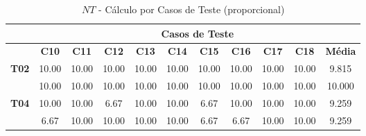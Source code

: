 \begin{table}[htbp]
	\centering
	\caption{$NT$ - Cálculo por Casos de Teste (proporcional)}
	\begin{tabular}{c|cccccccccc|}
		\cline{2-11}
		\rowcolor[HTML]{D0CECE} 
		\cellcolor[HTML]{F2F2F2}\textbf{} & \multicolumn{10}{c|}{\cellcolor[HTML]{D0CECE}\textbf{Casos de Teste}} \\ \hline
		\rowcolor[HTML]{D9D9D9} 
		\multicolumn{1}{|c|}{\cellcolor[HTML]{D0CECE}\textbf{Part.}} & \multicolumn{1}{c|}{\cellcolor[HTML]{D9D9D9}\textbf{C10}} & \multicolumn{1}{c|}{\cellcolor[HTML]{D9D9D9}\textbf{C11}} & \multicolumn{1}{c|}{\cellcolor[HTML]{D9D9D9}\textbf{C12}} & \multicolumn{1}{c|}{\cellcolor[HTML]{D9D9D9}\textbf{C13}} & \multicolumn{1}{c|}{\cellcolor[HTML]{D9D9D9}\textbf{C14}} & \multicolumn{1}{c|}{\cellcolor[HTML]{D9D9D9}\textbf{C15}} & \multicolumn{1}{c|}{\cellcolor[HTML]{D9D9D9}\textbf{C16}} & \multicolumn{1}{c|}{\cellcolor[HTML]{D9D9D9}\textbf{C17}} & \multicolumn{1}{c|}{\cellcolor[HTML]{D9D9D9}\textbf{C18}} & \textbf{Média} \\ \hline
		\multicolumn{1}{|c|}{\textbf{T02}} & \multicolumn{1}{c|}{10.00} & \multicolumn{1}{c|}{10.00} & \multicolumn{1}{c|}{10.00} & \multicolumn{1}{c|}{10.00} & \multicolumn{1}{c|}{10.00} & \multicolumn{1}{c|}{10.00} & \multicolumn{1}{c|}{10.00} & \multicolumn{1}{c|}{10.00} & \multicolumn{1}{c|}{10.00} & 9.815 \\ \hline
		\rowcolor[HTML]{F2F2F2} 
		\multicolumn{1}{|c|}{\cellcolor[HTML]{F2F2F2}\textbf{T03}} & \multicolumn{1}{c|}{\cellcolor[HTML]{F2F2F2}10.00} & \multicolumn{1}{c|}{\cellcolor[HTML]{F2F2F2}10.00} & \multicolumn{1}{c|}{\cellcolor[HTML]{F2F2F2}10.00} & \multicolumn{1}{c|}{\cellcolor[HTML]{F2F2F2}10.00} & \multicolumn{1}{c|}{\cellcolor[HTML]{F2F2F2}10.00} & \multicolumn{1}{c|}{\cellcolor[HTML]{F2F2F2}10.00} & \multicolumn{1}{c|}{\cellcolor[HTML]{F2F2F2}10.00} & \multicolumn{1}{c|}{\cellcolor[HTML]{F2F2F2}10.00} & \multicolumn{1}{c|}{\cellcolor[HTML]{F2F2F2}10.00} & 10.000 \\ \hline
		\multicolumn{1}{|c|}{\textbf{T04}} & \multicolumn{1}{c|}{10.00} & \multicolumn{1}{c|}{10.00} & \multicolumn{1}{c|}{6.67} & \multicolumn{1}{c|}{10.00} & \multicolumn{1}{c|}{10.00} & \multicolumn{1}{c|}{6.67} & \multicolumn{1}{c|}{10.00} & \multicolumn{1}{c|}{10.00} & \multicolumn{1}{c|}{10.00} & 9.259 \\ \hline
		\rowcolor[HTML]{F2F2F2} 
		\multicolumn{1}{|c|}{\cellcolor[HTML]{F2F2F2}\textbf{T05}} & \multicolumn{1}{c|}{\cellcolor[HTML]{F2F2F2}6.67} & \multicolumn{1}{c|}{\cellcolor[HTML]{F2F2F2}10.00} & \multicolumn{1}{c|}{\cellcolor[HTML]{F2F2F2}10.00} & \multicolumn{1}{c|}{\cellcolor[HTML]{F2F2F2}10.00} & \multicolumn{1}{c|}{\cellcolor[HTML]{F2F2F2}10.00} & \multicolumn{1}{c|}{\cellcolor[HTML]{F2F2F2}6.67} & \multicolumn{1}{c|}{\cellcolor[HTML]{F2F2F2}6.67} & \multicolumn{1}{c|}{\cellcolor[HTML]{F2F2F2}10.00} & \multicolumn{1}{c|}{\cellcolor[HTML]{F2F2F2}10.00} & 9.259 \\ \hline

\end{tabular}
\end{table}
